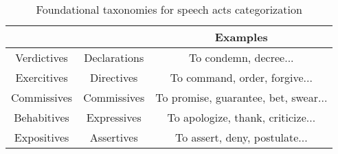 \documentclass[11pt]{article}
\begin{document}
\begin{table}
	\begin{tabularx}{\textwidth}{c c c}
		\toprule
		\cite{austin1975things} & \cite{searle1976taxonomy} & Examples \\
		\midrule
		Verdictives & Declarations & To condemn, decree... \\
		Exercitives & Directives & To command, order, forgive... \\
		Commissives & Commissives & To promise, guarantee, bet, swear... \\
		Behabitives & Expressives & To apologize, thank, criticize... \\
		Expositives & Assertives & To assert, deny, postulate... \\
		\bottomrule
	\end{tabularx}
	\caption{Foundational taxonomies for speech acts categorization}
	\label{fig:fundamentalTaxonomies}
\end{table}
\end{document}
